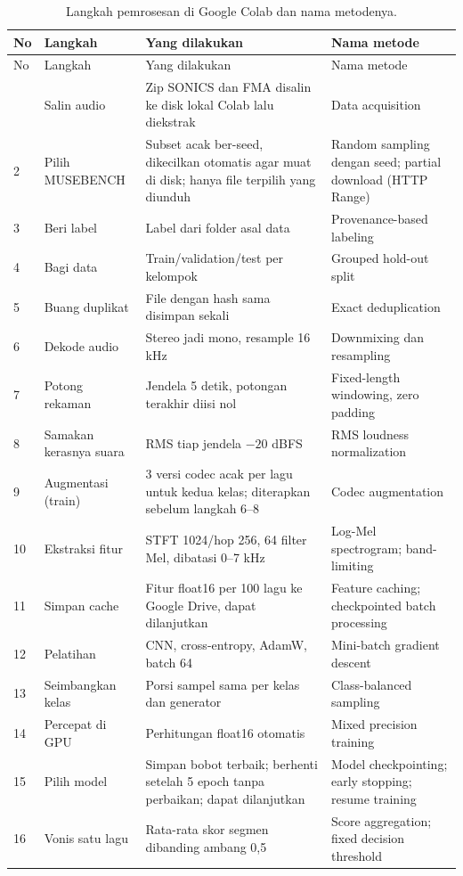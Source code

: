 {\singlespacing\small
\begin{longtable}{L{0.5cm} L{2.4cm} L{5.0cm} L{3.9cm}}
\caption{Langkah pemrosesan di Google Colab dan nama metodenya.}\label{tab:colab}\\
\toprule
No & Langkah & Yang dilakukan & Nama metode\\
\midrule
\endfirsthead
\toprule
No & Langkah & Yang dilakukan & Nama metode\\
\midrule
\endhead
\bottomrule
{} & Salin audio & Zip SONICS dan FMA disalin ke disk lokal Colab lalu diekstrak & Data acquisition\\
2 & Pilih MUSEBENCH & Subset acak ber-seed, dikecilkan otomatis agar muat di disk; hanya file terpilih yang diunduh & Random sampling dengan seed; partial download (HTTP Range)\\
3 & Beri label & Label dari folder asal data & Provenance-based labeling\\
4 & Bagi data & Train/validation/test per kelompok & Grouped hold-out split\\
5 & Buang duplikat & File dengan hash sama disimpan sekali & Exact deduplication\\
6 & Dekode audio & Stereo jadi mono, resample 16 kHz & Downmixing dan resampling\\
7 & Potong rekaman & Jendela 5 detik, potongan terakhir diisi nol & Fixed-length windowing, zero padding\\
8 & Samakan kerasnya suara & RMS tiap jendela $-20$ dBFS & RMS loudness normalization\\
9 & Augmentasi (train) & 3 versi codec acak per lagu untuk kedua kelas; diterapkan sebelum langkah 6--8 & Codec augmentation\\
10 & Ekstraksi fitur & STFT 1024/hop 256, 64 filter Mel, dibatasi 0--7 kHz & Log-Mel spectrogram; band-limiting\\
11 & Simpan cache & Fitur float16 per 100 lagu ke Google Drive, dapat dilanjutkan & Feature caching; checkpointed batch processing\\
12 & Pelatihan & CNN, cross-entropy, AdamW, batch 64 & Mini-batch gradient descent\\
13 & Seimbangkan kelas & Porsi sampel sama per kelas dan generator & Class-balanced sampling\\
14 & Percepat di GPU & Perhitungan float16 otomatis & Mixed precision training\\
15 & Pilih model & Simpan bobot terbaik; berhenti setelah 5 epoch tanpa perbaikan; dapat dilanjutkan & Model checkpointing; early stopping; resume training\\
16 & Vonis satu lagu & Rata-rata skor segmen dibanding ambang 0,5 & Score aggregation; fixed decision threshold\\
\end{longtable}}

